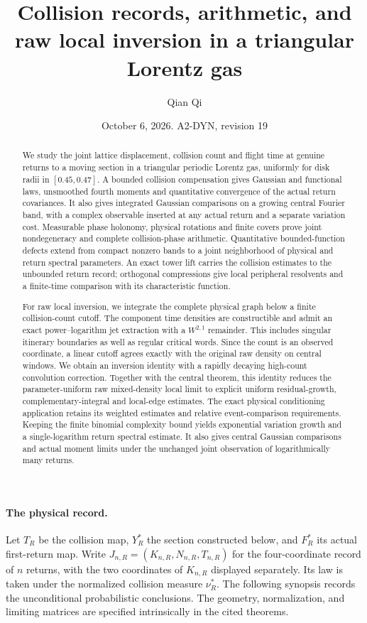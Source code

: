 \documentclass[11pt,reqno]{amsart}
\title[Collision records and raw local inversion]{Collision records, arithmetic, and raw local inversion in a triangular Lorentz gas}
\author{Qian Qi}
\date{October 6, 2026. A2-DYN, revision 19}
\numberwithin{equation}{section}
\theoremstyle{definition}\newtheorem{definition}[theorem]{Definition}
\theoremstyle{remark}\newtheorem{remark}[theorem]{Remark}
\begin{document}
\raggedbottom
\begin{abstract}
We study the joint lattice displacement, collision count and flight time
at genuine returns to a moving section in a triangular periodic Lorentz
gas, uniformly for disk radii in $[0.45,0.47]$. A bounded collision
compensation gives Gaussian and functional laws, unsmoothed fourth
moments and quantitative convergence of the actual return covariances.
It also gives integrated Gaussian comparisons on a growing central
Fourier band, with a complex observable inserted at any actual return
and a separate variation cost. Measurable phase holonomy, physical
rotations and finite covers prove joint nondegeneracy and complete
collision-phase arithmetic. Quantitative bounded-function defects extend
from compact nonzero bands to a joint neighborhood of physical and
return spectral parameters. An exact tower lift carries the collision
estimates to the unbounded return record; orthogonal compressions give
local peripheral resolvents and a finite-time comparison with its
characteristic function.

For raw local inversion, we integrate the complete physical graph below
a finite collision-count cutoff. The component time densities are
constructible and admit an exact power--logarithm jet extraction with a
$W^{2,1}$ remainder. This includes singular itinerary boundaries as well
as regular critical words. Since the count is an observed coordinate,
a linear cutoff agrees exactly with the original raw density on central
windows. We obtain an inversion identity with a rapidly decaying
high-count convolution correction. Together with the central theorem,
this identity reduces the parameter-uniform raw mixed-density local
limit to explicit uniform residual-growth, complementary-integral and
local-edge estimates. The exact physical conditioning application retains
its weighted estimates and relative event-comparison requirements.
Keeping the finite binomial complexity bound yields exponential
variation growth and a single-logarithm return spectral estimate.
It also gives central Gaussian comparisons and actual moment limits
under the unchanged joint observation of logarithmically many returns.
\end{abstract}
\maketitle

\paragraph{The physical record.}
Let $T_R$ be the collision map, $Y_R^*$ the section constructed below,
and $F_R^*$ its actual first-return map. Write
$J_{n,R}=(K_{n,R},N_{n,R},T_{n,R})$ for the four-coordinate record of
$n$ returns, with the two coordinates of $K_{n,R}$ displayed separately.
Its law is taken under the normalized collision measure $\nu_R^*$.
The following synopsis records the unconditional probabilistic
conclusions. The geometry, normalization, and limiting matrices are
specified intrinsically in the cited theorems.
\end{document}
